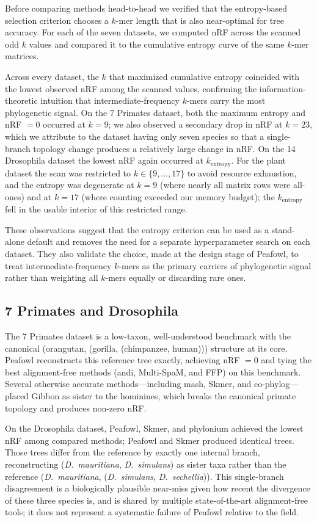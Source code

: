\documentclass[11pt]{article}
\begin{document}
Before comparing methods head-to-head we verified that the entropy-based
selection criterion chooses a $k$-mer length that is also near-optimal for
tree accuracy. For each of the seven datasets, we computed nRF across the
scanned odd $k$ values and compared it to the cumulative entropy curve of
the same $k$-mer matrices.

Across every dataset, the $k$ that maximized cumulative entropy coincided
with the lowest observed nRF among the scanned values, confirming the
information-theoretic intuition that intermediate-frequency $k$-mers carry
the most phylogenetic signal. On the 7 Primates dataset, both the maximum
entropy and nRF $= 0$ occurred at $k = 9$; we also observed a secondary
drop in nRF at $k = 23$, which we attribute to the dataset having only
seven species so that a single-branch topology change produces a relatively
large change in nRF. On the 14 Drosophila dataset the lowest nRF again
occurred at $k_\mathrm{entropy}$. For the plant dataset the scan was
restricted to $k \in \{9, \ldots, 17\}$ to avoid resource exhaustion, and
the entropy was degenerate at $k = 9$ (where nearly all matrix rows were
all-ones) and at $k = 17$ (where counting exceeded our memory budget); the
$k_\mathrm{entropy}$ fell in the usable interior of this restricted range.

These observations suggest that the entropy criterion can be used as a
stand-alone default and removes the need for a separate hyperparameter
search on each dataset. They also validate the choice, made at the design
stage of Peafowl, to treat intermediate-frequency $k$-mers as the primary
carriers of phylogenetic signal rather than weighting all $k$-mers equally
or discarding rare ones.

\subsection{7 Primates and Drosophila}

The 7 Primates dataset is a low-taxon, well-understood benchmark with the
canonical (orangutan, (gorilla, (chimpanzee, human))) structure at its core.
Peafowl reconstructs this reference tree exactly, achieving nRF $= 0$ and
tying the best alignment-free methods (andi, Multi-SpaM, and FFP) on this
benchmark. Several otherwise accurate methods---including mash, Skmer, and
co-phylog---placed Gibbon as sister to the hominines, which breaks the
canonical primate topology and produces non-zero nRF.

On the Drosophila dataset, Peafowl, Skmer, and phylonium achieved the
lowest nRF among compared methods; Peafowl and Skmer produced identical
trees. Those trees differ from the reference by exactly one internal
branch, reconstructing (\textit{D.~mauritiana}, \textit{D.~simulans}) as
sister taxa rather than the reference (\textit{D.~mauritiana},
(\textit{D.~simulans}, \textit{D.~sechellia})). This single-branch
disagreement is a biologically plausible near-miss given how recent the
divergence of these three species is, and is shared by multiple
state-of-the-art alignment-free tools; it does not represent a systematic
failure of Peafowl relative to the field.
\end{document}
